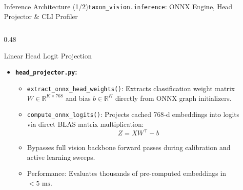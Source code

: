 \begin{frame}{Inference Architecture (1/2)}{\texttt{taxon\_vision.inference}: ONNX Engine, Head Projector \& CLI Profiler}
\begin{columns}[T]
\begin{column}{0.48\textwidth}
\begin{block}{Linear Head Logit Projection}
\begin{itemize}
                    \item \textbf{\texttt{head\_projector.py}:}
                        \begin{itemize}\tiny
                            \item \texttt{extract\_onnx\_head\_weights()}: Extracts classification weight matrix $W \in \mathbb{R}^{K \times 768}$ and bias $b \in \mathbb{R}^K$ directly from ONNX graph initializers.
                            \item \texttt{compute\_onnx\_logits()}: Projects cached 768-d embeddings into logits via direct BLAS matrix multiplication:
                                $$Z = X W^\top + b$$
                            \item Bypasses full vision backbone forward passes during calibration and active learning sweeps.
                            \item Performance: Evaluates thousands of pre-computed embeddings in $< 5\text{ ms}$.
                        \end{itemize}
                \end{itemize}
            \end{block}
        \end{column}
    \end{columns}

\end{frame}

